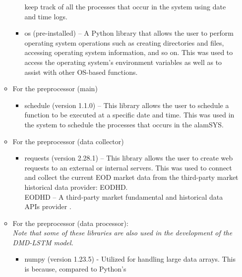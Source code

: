 \begin{itemize}
\begin{itemize}
\begin{itemize}
                    keep track of all the processes that occur in the 
                    system using date and time logs.
                    \item[\ding{109}] os (pre-installed) – A Python library that allows 
                    the user to perform operating system operations such as creating 
                    directories and files, accessing operating system information, 
                    and so on. This was used to access the operating system's 
                    environment variables as well as to assist with other OS-based 
                    functions.
                \end{itemize}
            \item[\ding{108}] For the preprocessor (main)
                    \begin{itemize}
                        \item[\ding{109}] schedule (version 1.1.0) – This library allows 
                        the user to schedule a function to be executed at a specific
                        date and time. This was used in the system to schedule the
                        processes that occurs in the alamSYS.
                    \end{itemize}
            \item[\ding{108}] For the preprocessor (data collector)
                \begin{itemize}
                    \item[\ding{109}] requests (version 2.28.1) – This library allows the user to create web 
                    requests to an external or internal servers. This was used to connect and collect 
                    the current EOD market data from the third-party market historical data provider: EODHD.
                    \\ EODHD – A third-party market fundamental and historical data APIs provider
                    \cite{EODHD}.
                \end{itemize}
            \item[\ding{108}] For the preprocessor (data processor):
            \\ \textit{Note that some of these libraries are also used in the development of the DMD-LSTM model.}
                \begin{itemize}
                    \item[\ding{109}] numpy (version 1.23.5) - Utilized for handling large 
                    data arrays. This is because, compared to Python's 

\end{itemize}
\end{itemize}
\end{itemize}
